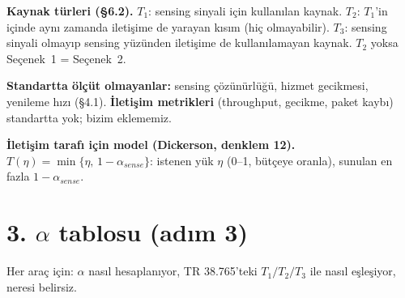 \documentclass[10.5pt,a4paper]{article}
\begin{document}
\textbf{Kaynak türleri (§6.2).} $T_1$: sensing sinyali için kullanılan kaynak. $T_2$: $T_1$'in içinde aynı zamanda iletişime de yarayan kısım (hiç olmayabilir). $T_3$: sensing sinyali olmayıp sensing yüzünden iletişime de kullanılamayan kaynak. $T_2$ yoksa Seçenek~1 = Seçenek~2.

\textbf{Standartta ölçüt olmayanlar:} sensing çözünürlüğü, hizmet gecikmesi, yenileme hızı (§4.1). \textbf{İletişim metrikleri} (throughput, gecikme, paket kaybı) standartta yok; bizim eklememiz.

\textbf{İletişim tarafı için model (Dickerson, denklem 12).} $T(\eta)=\min\{\eta,\,1-\alpha_{sense}\}$: istenen yük $\eta$ (0--1, bütçeye oranla), sunulan en fazla $1-\alpha_{sense}$.

\section*{3. $\alpha$ tablosu (adım 3)}
Her araç için: $\alpha$ nasıl hesaplanıyor, TR 38.765'teki $T_1/T_2/T_3$ ile nasıl eşleşiyor, neresi belirsiz.
\end{document}
